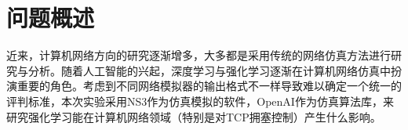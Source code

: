 
\section{问题概述}

近来，计算机网络方向的研究逐渐增多，大多都是采用传统的网络仿真方法进行研究与分析。随着人工智能的兴起，深度学习与强化学习逐渐在计算机网络仿真中扮演重要的角色。考虑到不同网络模拟器的输出格式不一样导致难以确定一个统一的评判标准，本次实验采用NS3作为仿真模拟的软件，OpenAI作为仿真算法库，来研究强化学习能在计算机网络领域（特别是对TCP拥塞控制）产生什么影响。